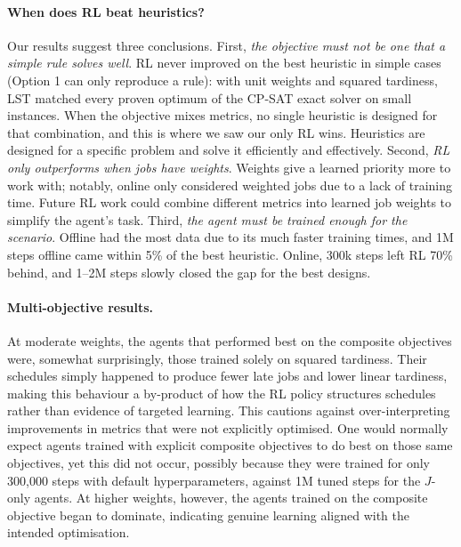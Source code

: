 \documentclass[12pt]{article}
\begin{document}
\paragraph{When does RL beat heuristics?} Our results suggest three conclusions. First, \emph{the objective must not be one that a simple rule solves well}. RL never improved on the best heuristic in simple cases (Option 1 can only reproduce a rule): with unit weights and squared tardiness, LST matched every proven optimum of the CP-SAT exact solver on small instances. When the objective mixes metrics, no single heuristic is designed for that combination, and this is where we saw our only RL wins. Heuristics are designed for a specific problem and solve it efficiently and effectively. Second, \emph{RL only outperforms when jobs have weights}. Weights give a learned priority more to work with; notably, online only considered weighted jobs due to a lack of training time. Future RL work could combine different metrics into learned job weights to simplify the agent's task. Third, \emph{the agent must be trained enough for the scenario}. Offline had the most data due to its much faster training times, and 1M steps offline came within 5\% of the best heuristic. Online, 300k steps left RL 70\% behind, and 1--2M steps slowly closed the gap for the best designs.

\paragraph{Multi-objective results.} At moderate weights, the agents that performed best on the composite objectives were, somewhat surprisingly, those trained solely on squared tardiness. Their schedules simply happened to produce fewer late jobs and lower linear tardiness, making this behaviour a by-product of how the RL policy structures schedules rather than evidence of targeted learning. This cautions against over-interpreting improvements in metrics that were not explicitly optimised. One would normally expect agents trained with explicit composite objectives to do best on those same objectives, yet this did not occur, possibly because they were trained for only 300,000 steps with default hyperparameters, against 1M tuned steps for the $J$-only agents. At higher weights, however, the agents trained on the composite objective began to dominate, indicating genuine learning aligned with the intended optimisation.
\end{document}
